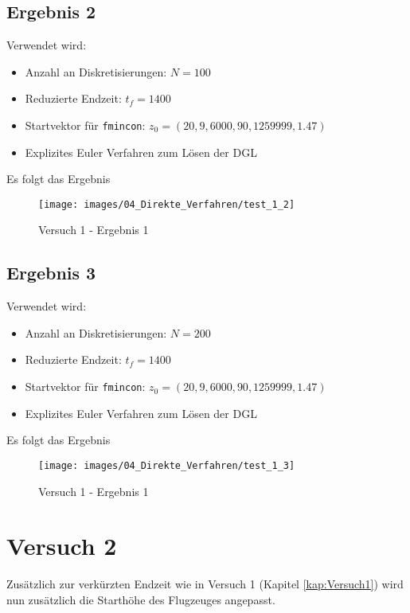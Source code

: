 \newpage
\subsection{Ergebnis 2}
Verwendet wird:
\begin{itemize}
\item Anzahl an Diskretisierungen: $N = 100$ 
\item Reduzierte Endzeit: $t_f = 1400$
\item Startvektor für \texttt{fmincon}: $z_0 = (20,9,6000,90,1259999,1.47)$
\item Explizites Euler Verfahren zum Lösen der DGL
\end{itemize}
Es folgt das Ergebnis
\begin{figure}[H]
\begin{center}
\texttt{[image: images/04\_Direkte\_Verfahren/test\_1\_2]}
\caption{Versuch 1 - Ergebnis 1}\label{img:test_1_2}
\end{center}
\end{figure}

\newpage
\subsection{Ergebnis 3}
Verwendet wird:
\begin{itemize}
\item Anzahl an Diskretisierungen: $N = 200$ 
\item Reduzierte Endzeit: $t_f = 1400$
\item Startvektor für \texttt{fmincon}: $z_0 = (20,9,6000,90,1259999,1.47)$
\item Explizites Euler Verfahren zum Lösen der DGL
\end{itemize}
Es folgt das Ergebnis
\begin{figure}[H]
\begin{center}
\texttt{[image: images/04\_Direkte\_Verfahren/test\_1\_3]}
\caption{Versuch 1 - Ergebnis 1}\label{img:test_1_3}
\end{center}
\end{figure}















\newpage
\section{Versuch 2}
Zusätzlich zur verkürzten Endzeit wie in Versuch 1 (Kapitel \ref{kap:Versuch1}) wird nun zusätzlich die Starthöhe des Flugzeuges angepasst.

